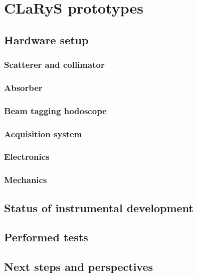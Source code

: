 \chapter{CLaRyS prototypes}


\vfill

\minitoc

\newpage


\section{Hardware setup}

\subsection{Scatterer and collimator}

\subsection{Absorber}

\subsection{Beam tagging hodoscope}

\subsection{Acquisition system}

\subsection{Electronics}

\subsection{Mechanics}

\section{Status of instrumental development}

\section{Performed tests}

\section{Next steps and perspectives}

\clearpage
